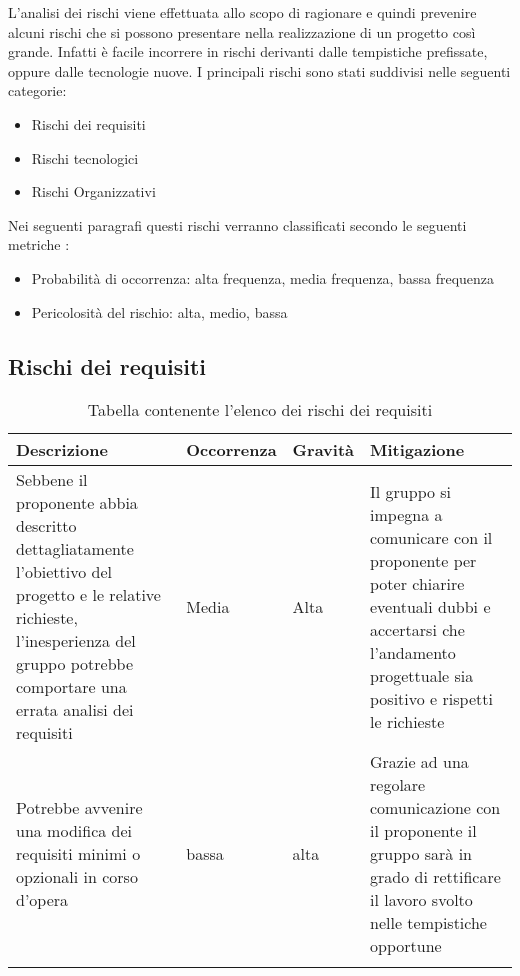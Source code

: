 \documentclass[../piano_di_progetto.tex]{subfiles}
\begin{document}
L’analisi dei rischi viene effettuata allo scopo di ragionare e quindi prevenire alcuni rischi che si possono presentare nella realizzazione di un progetto così grande. Infatti è facile incorrere in rischi derivanti dalle tempistiche prefissate, oppure dalle tecnologie nuove.
I principali rischi sono stati suddivisi nelle seguenti categorie:
\begin{itemize}
\item Rischi dei requisiti 
\item Rischi tecnologici 
\item Rischi Organizzativi
\end{itemize}
Nei seguenti paragrafi questi rischi verranno classificati secondo le seguenti metriche :
\begin{itemize}
\item Probabilità di occorrenza: alta frequenza, media frequenza, bassa frequenza
\item Pericolosità del rischio: alta, medio, bassa
\end{itemize}

\subsection{Rischi dei requisiti}%
\label{sub:rischi_req}

\begin{center}
	\begin{longtable}{|p{3.5cm}|p{2cm}|p{2cm}|p{3.5cm}|}
		\hline
		\rowcolor{lightgray}
		{\textbf{Descrizione}} & {\textbf{Occorrenza}} & {\textbf{Gravità}} & {\textbf{Mitigazione}} \\

		\hline
			Sebbene il proponente abbia descritto dettagliatamente l’obiettivo del progetto e le relative richieste, l’inesperienza del gruppo potrebbe comportare una errata analisi dei requisiti
			&
			Media
			& 
			Alta
			&
			Il gruppo si impegna a comunicare con il proponente per poter chiarire eventuali dubbi e accertarsi che l’andamento progettuale sia positivo e rispetti le richieste\\
			
			\hline
			Potrebbe avvenire una modifica dei requisiti minimi o opzionali in corso d’opera
			&
			bassa
			& 
			alta
			& 
			Grazie ad una regolare comunicazione con il proponente il gruppo sarà in grado di rettificare il lavoro svolto nelle tempistiche opportune\\
			\hline
\caption{Tabella contenente l'elenco dei rischi dei requisiti}
	\end{longtable}

\end{center}
\end{document}
